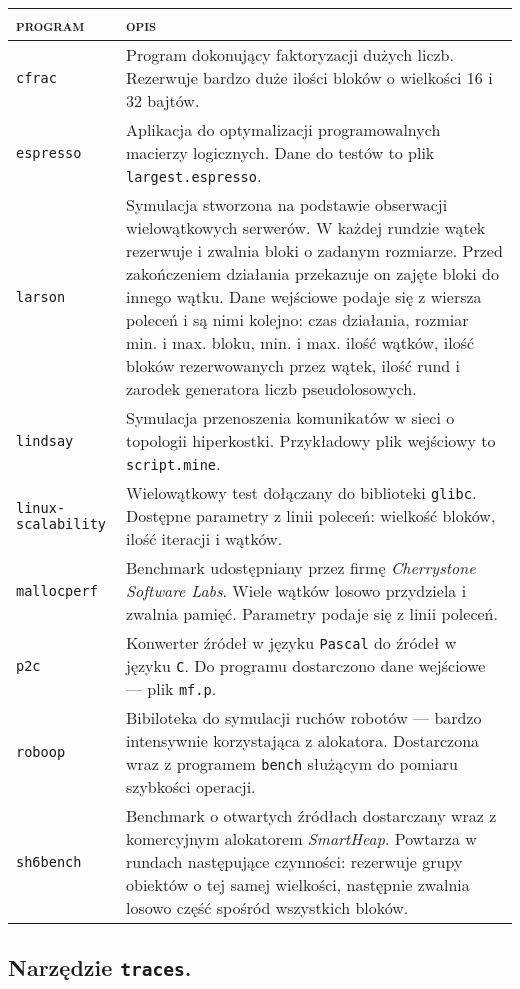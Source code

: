 \documentclass[12pt,a4paper,titlepage,twoside]{mwart}
\begin{document}
\begin{tabularx}{\textwidth}{|l|X|}
\hline
\textsc{program} & \textsc{opis} \\
\hline
\hline
\verb+cfrac+ & Program dokonujący faktoryzacji dużych liczb. Rezerwuje bardzo
duże ilości bloków o wielkości 16 i 32 bajtów. \\
\hline
\verb+espresso+ & Aplikacja do optymalizacji programowalnych macierzy
logicznych. Dane do testów to plik \texttt{largest.espresso}. \\
\hline
\verb+larson+ & Symulacja stworzona na podstawie obserwacji wielowątkowych
serwerów. W każdej rundzie wątek rezerwuje i zwalnia bloki o zadanym rozmiarze.
Przed zakończeniem działania przekazuje on zajęte bloki do innego wątku. Dane
wejściowe podaje się z wiersza poleceń i są nimi kolejno: czas działania, rozmiar
min. i max. bloku, min. i max. ilość wątków, ilość bloków rezerwowanych przez
wątek, ilość rund i zarodek generatora liczb pseudolosowych. \\
\hline
\verb+lindsay+ & Symulacja przenoszenia komunikatów w sieci o topologii
hiperkostki. Przykładowy plik wejściowy to \texttt{script.mine}. \\
\hline
\verb+linux-scalability+ & Wielowątkowy test dołączany do biblioteki
\texttt{glibc}. Dostępne parametry z linii poleceń: wielkość bloków, ilość
iteracji i wątków.\\
\hline
\verb+mallocperf+ & Benchmark udostępniany przez firmę \textit{Cherrystone
Software Labs}. Wiele wątków losowo przydziela i zwalnia pamięć. Parametry
podaje się z linii poleceń.\\
\hline
\verb+p2c+ & Konwerter źródeł w języku \texttt{Pascal} do źródeł w języku
\texttt{C}. Do programu dostarczono dane wejściowe --- plik \texttt{mf.p}. \\
\hline
\verb+roboop+ & Bibiloteka do symulacji ruchów robotów --- bardzo intensywnie
korzystająca z alokatora. Dostarczona wraz z programem \texttt{bench} służącym
do pomiaru szybkości operacji. \\
\hline
\verb+sh6bench+ & Benchmark o otwartych źródłach dostarczany wraz z komercyjnym
alokatorem \textit{SmartHeap}. Powtarza w rundach następujące czynności:
rezerwuje grupy obiektów o tej samej wielkości, następnie zwalnia losowo część
spośród wszystkich bloków. \\
\hline
\end{tabularx}

\subsection{Narzędzie \texttt{traces}.}
\end{document}
